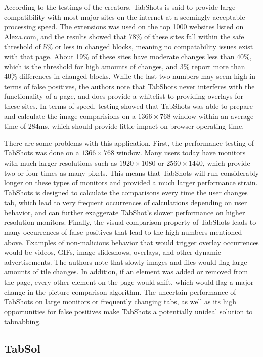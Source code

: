 \documentclass[12pt]{article}
\begin{document}
\begin{doublespace}
According to the testings of the creators, TabShots is said to provide large compatibility with most major sites on the internet at a seemingly acceptable processing speed.  The extensions was used on the top 1000 websites listed on Alexa.com, and the results showed that 78\% of these sites fall within the safe threshold of 5\% or less in changed blocks, meaning no compatability issues exist with that page.  About 19\% of these sites have moderate changes less than 40\%, which is the threshold for high amounts of changes, and 3\% report more than 40\% differences in changed blocks.  While the last two numbers may seem high in terms of false positives, the authors note that TabShots never interferes with the functionality of a page, and does provide a whitelist to providing overlays for these sites.  In terms of speed, testing showed that TabShots was able to prepare and calculate the image comparisions on a $1366 \times 768$ window within an average time of 284ms, which should provide little impact on browser operating time.

There are some problems with this application.  First, the performance testing of TabShots was done on a $1366 \times 768$ window.  Many users today have monitors with much larger resolutions such as $1920 \times 1080$ or $2560 \times 1440$, which provide two or four times as many pixels.  This means that TabShots will run considerably longer on these types of monitors and provided a much larger performance strain.  TabShots is designed to calculate the comparisons every time the user changes tab, which lead to very frequent occurrences of calculations depending on user behavior, and can further exaggerate TabShot's slower performance on higher resolution monitors.  Finally, the visual comparison property of TabShots leads to many occurrences of false positives that lead to the high numbers mentioned above.  Examples of non-malicious behavior that would trigger overlay occurrences would be videos, GIFs, image slideshows, overlays, and other dynamic advertisements.  The authors note that slowly images and files would flag large amounts of tile changes.  In addition, if an element was added or removed from the page, every other element on the page would shift, which would flag a major change in the picture comparison algorithm.  The uncertain performance of TabShots on large monitors or frequently changing tabs, as well as its high opportunities for false positives make TabShots a potentially unideal solution to tabnabbing. 
\subsection{TabSol}
\begin{comment}
Another defense against tabnabbing, TabSol created by Amandeep Singh and Somanath Tripathy \cite{TabSol}, compares the hash values of the web page to detect changes and notifies the user. 
\end{comment}


\end{doublespace}
\end{document}
